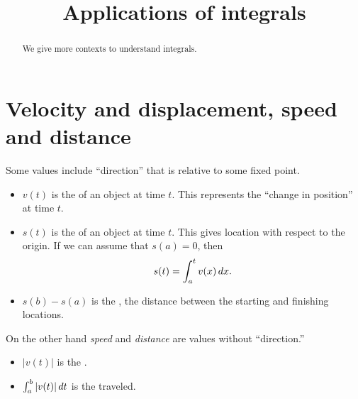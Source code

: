 \documentclass{ximera}
\title[Dig-In:]{Applications of integrals}
\begin{document}
\begin{abstract}
We give more contexts to understand integrals.
\end{abstract}
\maketitle



\section{Velocity and displacement, speed and distance}

Some values include ``direction'' that is relative to some fixed point.

\begin{definition}\hfill
  \begin{itemize}
  \item $v(t)$ is the  of an object at time $t$. This
    represents the ``change in position'' at time $t$.
  \item $s(t)$ is the  of an object at time $t$. This
    gives location with respect to the origin. If we can assume that
    $s(a) = 0$, then
    \[
    s(t) = \int_a^t v(x) \,d x.
    \]
  \item $s(b) -s(a)$ is the , the distance between the
    starting and finishing locations.
  \end{itemize}
\end{definition}

On the other hand \textit{speed} and \textit{distance} are values
without ``direction.''

\begin{definition}\hfil
  \begin{itemize}
  \item $|v(t)|$ is the .
  \item $\int_a^b |v(t)| \,d t$ is the  traveled.
  \end{itemize}
\end{definition}
\end{document}
